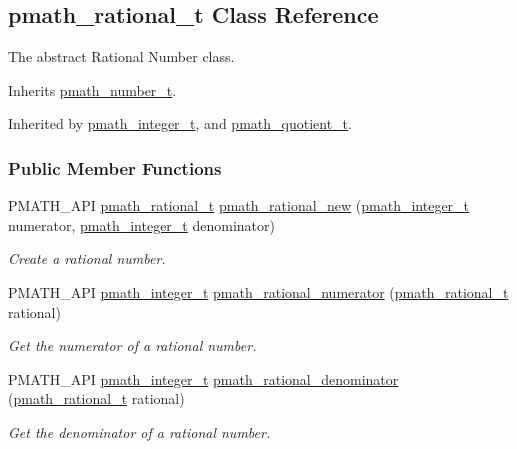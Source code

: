 \hypertarget{classpmath__rational__t}{
\subsection{pmath\_\-rational\_\-t Class Reference}
\label{classpmath__rational__t}
}
The abstract Rational Number class.  


Inherits \hyperlink{classpmath__number__t}{pmath\_\-number\_\-t}.

Inherited by \hyperlink{classpmath__integer__t}{pmath\_\-integer\_\-t}, and \hyperlink{classpmath__quotient__t}{pmath\_\-quotient\_\-t}.

\subsubsection*{Public Member Functions}
\begin{CompactItemize}
\item 
PMATH\_\-API \hyperlink{classpmath__rational__t}{pmath\_\-rational\_\-t} \hyperlink{group__numbers_g142d493a889a7d94bafe79025b61d220}{pmath\_\-rational\_\-new} (\hyperlink{classpmath__integer__t}{pmath\_\-integer\_\-t} numerator, \hyperlink{classpmath__integer__t}{pmath\_\-integer\_\-t} denominator)
\begin{CompactList}\small\item\em Create a rational number. \item\end{CompactList}\item 
PMATH\_\-API \hyperlink{classpmath__integer__t}{pmath\_\-integer\_\-t} \hyperlink{group__numbers_gab6f926fcf84e9cf62c0d99699e491bf}{pmath\_\-rational\_\-numerator} (\hyperlink{classpmath__rational__t}{pmath\_\-rational\_\-t} rational)
\begin{CompactList}\small\item\em Get the numerator of a rational number. \item\end{CompactList}\item 
PMATH\_\-API \hyperlink{classpmath__integer__t}{pmath\_\-integer\_\-t} \hyperlink{group__numbers_ga3f1718d2252ebce77bed83df7223f4c}{pmath\_\-rational\_\-denominator} (\hyperlink{classpmath__rational__t}{pmath\_\-rational\_\-t} rational)
\begin{CompactList}\small\item\em Get the denominator of a rational number. \item\end{CompactList}\end{CompactItemize}


